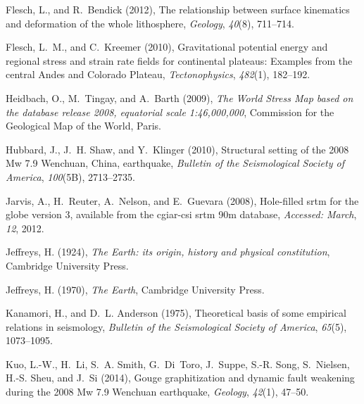 \documentclass[twocolumn,jgrga]{AGUTeX}
\begin{document}
\begin{article}
{{{\begin{thebibliography}{89}
Flesch, L., and R.~Bendick (2012), The relationship between surface kinematics
  and deformation of the whole lithosphere, \textit{Geology}, \textit{40}(8),
  711--714.

Flesch, L.~M., and C.~Kreemer (2010), Gravitational potential energy and
  regional stress and strain rate fields for continental plateaus: {E}xamples
  from the central {A}ndes and {C}olorado {P}lateau, \textit{Tectonophysics},
  \textit{482}(1), 182--192.

Heidbach, O., M.~Tingay, and A.~Barth (2009), \textit{The World Stress Map
  based on the database release 2008, equatorial scale 1:46,000,000},
  Commission for the Geological Map of the World, Paris.

Hubbard, J., J.~H. Shaw, and Y.~Klinger (2010), Structural setting of the 2008
  {M}w 7.9 {W}enchuan, {C}hina, earthquake, \textit{Bulletin of the
  Seismological Society of America}, \textit{100}(5B), 2713--2735.

Jarvis, A., H.~Reuter, A.~Nelson, and E.~Guevara (2008), Hole-filled srtm for
  the globe version 3, available from the cgiar-csi srtm 90m database,
  \textit{Accessed: March}, \textit{12}, 2012.

Jeffreys, H. (1924), \textit{The Earth: its origin, history and physical
  constitution}, Cambridge University Press.

Jeffreys, H. (1970), \textit{The Earth}, Cambridge University Press.

Kanamori, H., and D.~L. Anderson (1975), Theoretical basis of some empirical
  relations in seismology, \textit{Bulletin of the Seismological Society of
  America}, \textit{65}(5), 1073--1095.

Kuo, L.-W., H.~Li, S.~A. Smith, G.~Di~Toro, J.~Suppe, S.-R. Song, S.~Nielsen,
  H.-S. Sheu, and J.~Si (2014), Gouge graphitization and dynamic fault
  weakening during the 2008 {M}w 7.9 {W}enchuan earthquake, \textit{Geology},
  \textit{42}(1), 47--50.


\end{thebibliography}}}}
\end{article}
\end{document}
